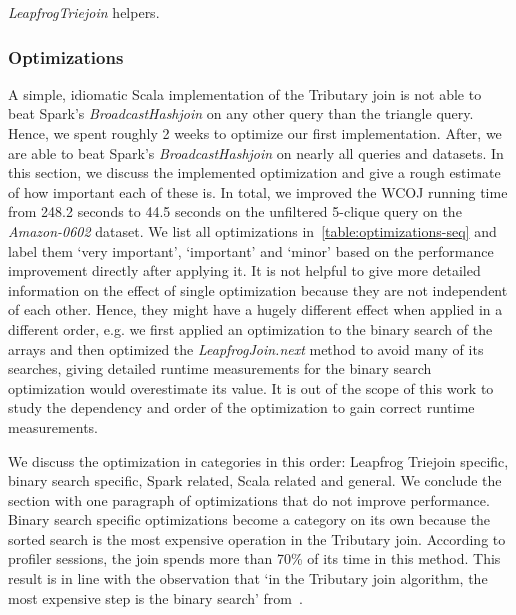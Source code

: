 \begin{listing}[H]
    \inputminted{scala}{code/LeapfrogTriejoinHelpers.scala}
    \caption{\textit{LeapfrogTriejoin} helpers.}
    \label{lst:leapfrog-triejoin-helpers}
\end{listing}

\subsubsection{Optimizations}
A simple, idiomatic Scala implementation of the Tributary join is not able to beat Spark's \textit{BroadcastHashjoin} on any other query than the triangle query.
Hence, we spent roughly 2 weeks to optimize our first implementation.
After, we are able to beat Spark's \textit{BroadcastHashjoin} on nearly all queries and datasets.
In this section, we discuss the implemented optimization and give a rough estimate of how important each of these is.
In total, we improved the WCOJ running time from 248.2 seconds to 44.5 seconds on the unfiltered 5-clique query on the
\textit{Amazon-0602} dataset.
We list all optimizations in~\cref{table:optimizations-seq} and label them `very important', `important' and `minor' based on the performance improvement directly after applying it.
It is not helpful to give more detailed information on the effect of single optimization because they are not independent of each other.
Hence, they might have a hugely different effect when applied in a different order, e.g. we first applied an optimization to the binary search of the arrays and then
optimized the \textit{LeapfrogJoin.next} method to avoid many of its searches, giving detailed runtime measurements for the binary search optimization would
overestimate its value.
It is out of the scope of this work to study the dependency and order of the optimization to gain correct runtime measurements.

We discuss the optimization in categories in this order: Leapfrog Triejoin specific, binary search specific, Spark related, Scala related and general.
We conclude the section with one paragraph of optimizations that do not improve performance.
Binary search specific optimizations become a category on its own because the sorted search is the most expensive operation in the Tributary join.
According to profiler sessions, the join spends more than 70\% of its time in this method. %
This result is in line with the observation that `in the Tributary join algorithm, the most expensive step is the binary search' from~\cite{myria-detailed}.

